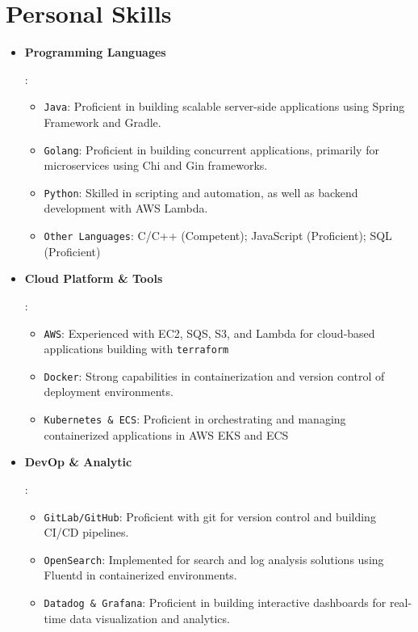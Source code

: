 \documentclass[letterpaper,11pt]{article}
\newcommand{\resumeItem}[2]{
  \item\small{
    \textbf{#1}{: #2 \vspace{-2pt}}
  }
}
\newcommand{\resumeSubItem}[2]{
  \item\small{
    \texttt{#1}{: #2 \vspace{-1pt}}
  }
}
\newcommand{\resumeItemListStart}{\begin{itemize}[leftmargin=*]}
\newcommand{\resumeItemListEnd}{\end{itemize}\vspace{-2pt}}
\newcommand{\resumeSubItemListStart}{\begin{itemize}[leftmargin=*]\vspace{-5pt}}
\newcommand{\resumeSubItemListEnd}{\end{itemize}\vspace{-5pt}}
\begin{document}
\section{Personal Skills}
    \resumeItemListStart
        \resumeItem{Programming Languages}{
          \resumeSubItemListStart
            \resumeSubItem{Java}{Proficient in building scalable server-side applications using Spring Framework and Gradle.}
            \resumeSubItem{Golang}{Proficient in building concurrent applications, primarily for microservices using Chi and Gin frameworks.}
            \resumeSubItem{Python}{Skilled in scripting and automation, as well as backend development with AWS Lambda.}
            \resumeSubItem{Other Languages}{C/C++ (Competent); JavaScript (Proficient); SQL (Proficient)}
          \resumeSubItemListEnd
        }
        \resumeItem{Cloud Platform \& Tools}{
          \resumeSubItemListStart
            \resumeSubItem{AWS}{Experienced with EC2, SQS, S3, and Lambda for cloud-based applications building with \texttt{terraform}}
            \resumeSubItem{Docker}{Strong capabilities in containerization and version control of deployment environments.}
            \resumeSubItem{Kubernetes \& ECS}{Proficient in orchestrating and managing containerized applications in AWS EKS and ECS}
          \resumeSubItemListEnd
        }
        \resumeItem{DevOp \& Analytic}{
          \resumeSubItemListStart
            \resumeSubItem{GitLab/GitHub}{Proficient with git for version control and building CI/CD pipelines.}
            \resumeSubItem{OpenSearch}{Implemented for search and log analysis solutions using Fluentd in containerized environments.}
            \resumeSubItem{Datadog \& Grafana}{Proficient in building interactive dashboards for real-time data visualization and analytics.}
          \resumeSubItemListEnd
        }
    \resumeItemListEnd
    
\end{document}
